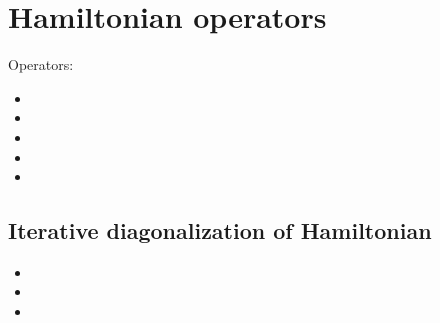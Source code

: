 \section{Hamiltonian operators}



Operators:
\begin{itemize}
\item {}
\item {}
\item {}
\item {}
\item {}
\end{itemize}

\subsection{Iterative diagonalization of Hamiltonian}

\begin{itemize}
\item {}
\item {}
\item {}
\end{itemize}
